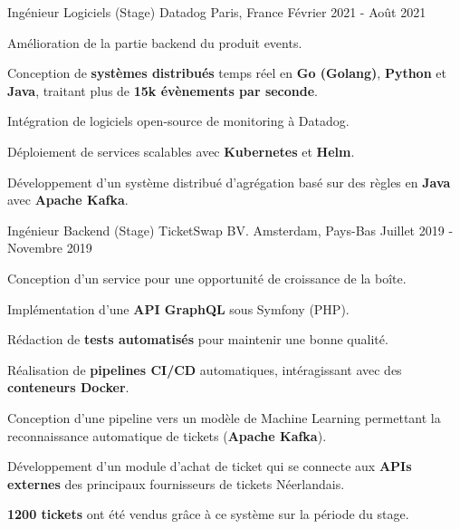\begin{cventries}
  \cventry
    {Ingénieur Logiciels (Stage)} %
    {Datadog} %
    {Paris, France} %
    {Février 2021 - Août 2021} %
    {
      \begin{cvitems} %
        \item {Amélioration de la partie backend du produit events.}
        \item {Conception de \textbf{systèmes distribués} temps réel en \textbf{Go (Golang)}, \textbf{Python} et \textbf{Java}, traitant plus de \textbf{15k évènements par seconde}.}
        \item {Intégration de logiciels open-source de monitoring à Datadog.}
        \item {Déploiement de services scalables avec \textbf{Kubernetes} et \textbf{Helm}.}
        \item {Développement d'un système distribué d'agrégation basé sur des règles en \textbf{Java} avec \textbf{Apache Kafka}.}
      \end{cvitems}
    }

  \cventry
    {Ingénieur Backend (Stage)} %
    {TicketSwap BV.} %
    {Amsterdam, Pays-Bas} %
    {Juillet 2019 - Novembre 2019} %
    {
      \begin{cvitems} %
        \item {Conception d'un service pour une opportunité de croissance de la boîte.}
        \item {Implémentation d'une \textbf{API GraphQL} sous Symfony (PHP).}
        \item {Rédaction de \textbf{tests automatisés} pour maintenir une bonne qualité.}
        \item {Réalisation de \textbf{pipelines CI/CD} automatiques, intéragissant avec des \textbf{conteneurs Docker}.}
        \item {Conception d'une pipeline vers un modèle de Machine Learning permettant la reconnaissance automatique de tickets (\textbf{Apache Kafka}).}
        \item {Développement d'un module d'achat de ticket qui se connecte aux \textbf{APIs externes} des principaux fournisseurs de tickets Néerlandais.}
        \item {\textbf{1200 tickets} ont été vendus grâce à ce système sur la période du stage.}
      \end{cvitems}
    }

\end{cventries}

